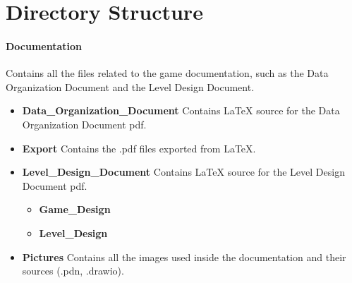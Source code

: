 \section{Directory Structure}

\paragraph{Documentation} Contains all the files related to the game documentation, such as the Data Organization Document and the Level Design Document.

\begin{itemize}[noitemsep, nolistsep, label={-}]
	\item \textbf{Data\_Organization\_Document} Contains LaTeX source for the Data Organization Document pdf.
	\item \textbf{Export} Contains the .pdf files exported from LaTeX.
	\item \textbf{Level\_Design\_Document} Contains LaTeX source for the Level Design Document pdf.
		\begin{itemize}[noitemsep, nolistsep, label={-}]
			\item \textbf{Game\_Design}
			\item \textbf{Level\_Design}
		\end{itemize}
		
	\item \textbf{Pictures} Contains all the images used inside the documentation and their sources (.pdn, .drawio).
		\begin{itemize}[noitemsep, nolistsep, label={-}]
		
\end{itemize}
\end{itemize}
